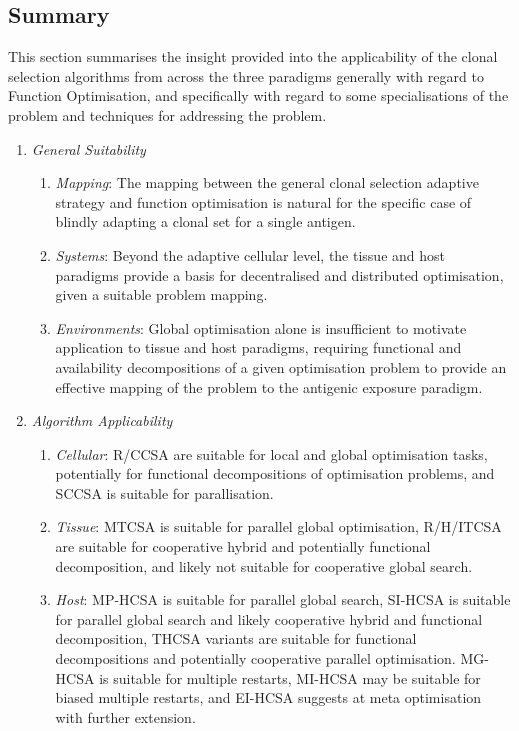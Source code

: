 %
%
\subsection{Summary}
\label{subsec:iidle:function:optimization:summary}
This section summarises the insight provided into the applicability of the clonal selection algorithms from across the three paradigms generally with regard to Function Optimisation, and specifically with regard to some specialisations of the problem and techniques for addressing the problem.

\begin{enumerate}
	\item \emph{General Suitability}
	\begin{enumerate}
		\item \emph{Mapping}: The mapping between the general clonal selection adaptive strategy and function optimisation is natural for the specific case of blindly adapting a clonal set for a single antigen.
		\item \emph{Systems}: Beyond the adaptive cellular level, the tissue and host paradigms provide a basis for decentralised and distributed optimisation, given a suitable problem mapping.
		\item \emph{Environments}: Global optimisation alone is insufficient to motivate application to tissue and host paradigms, requiring functional and availability decompositions of a given optimisation problem to provide an effective mapping of the problem to the antigenic exposure paradigm.
	\end{enumerate}
	
	\item \emph{Algorithm Applicability}
	\begin{enumerate}
		\item \emph{Cellular}: R/CCSA are suitable for local and global optimisation tasks, potentially for functional decompositions of optimisation problems, and SCCSA is suitable for parallisation.
		\item \emph{Tissue}: MTCSA is suitable for parallel global optimisation, R/H/ITCSA are suitable for cooperative hybrid and potentially functional decomposition, and likely not suitable for cooperative global search.		
		\item \emph{Host}: MP-HCSA is suitable for parallel global search, SI-HCSA is suitable for parallel global search and likely cooperative hybrid and functional decomposition, THCSA variants are suitable for functional decompositions and potentially cooperative parallel optimisation. MG-HCSA is suitable for multiple restarts, MI-HCSA may be suitable for biased multiple restarts, and EI-HCSA suggests at meta optimisation with further extension.
	\end{enumerate}		
\end{enumerate}

